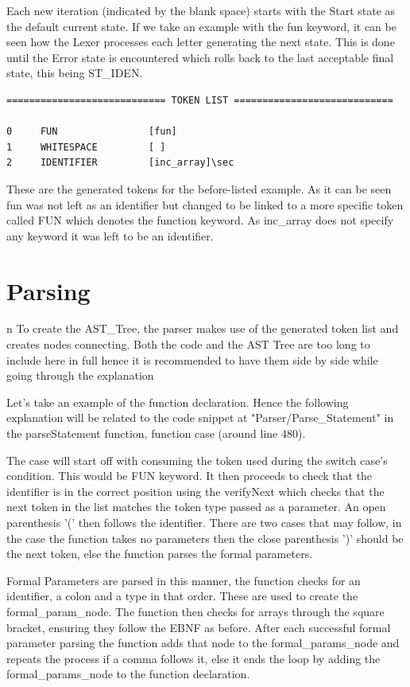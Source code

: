 \documentclass[12pt, a4paper]{report}
\begin{document}
Each new iteration (indicated by the blank space) starts with the Start state as the default current state. If we take an example with the fun keyword, it can be seen how the Lexer processes each letter generating the next state. This is done until the Error state is encountered which rolls back to the last acceptable final state, this being ST\_IDEN.
\begin{verbatim}
============================ TOKEN LIST ============================

0     FUN                [fun]
1     WHITESPACE         [ ]
2     IDENTIFIER         [inc_array]\sec
\end{verbatim}
These are the generated tokens for the before-listed example. As it can be seen fun was not left as an identifier but changed to be linked to a more specific token called FUN which denotes the function keyword. As inc\_array does not specify any keyword it was left to be an identifier.

\section{Parsing}n
To create the AST\_Tree, the parser makes use of the generated token list and creates nodes connecting. Both the code and the AST Tree are too long to include here in full hence it is recommended to have them side by side while going through the explanation

Let's take an example of the function declaration. Hence the following explanation will be related to the code snippet at "Parser/Parse\_Statement" in the parseStatement function, function case (around line 480).

The case will start off with consuming the token used during the switch case's condition. This would be FUN keyword. It then proceeds to check that the identifier is in the correct position using the verifyNext which checks that the next token in the list matches the token type passed as a parameter. An open parenthesis '(' then follows the identifier. There are two cases that may follow, in the case the function takes no parameters then the close parenthesis ')' should be the next token, else the function parses the formal parameters.

Formal Parameters are parsed in this manner, the function checks for an identifier, a colon and a type in that order. These are used to create the formal\_param\_node. The function then checks for arrays through the square bracket, ensuring they follow the EBNF as before. After each successful formal parameter parsing the function adds that node to the formal\_params\_node and repeats the process if a comma follows it, else it ends the loop by adding the formal\_params\_node to the function declaration.
\end{document}
